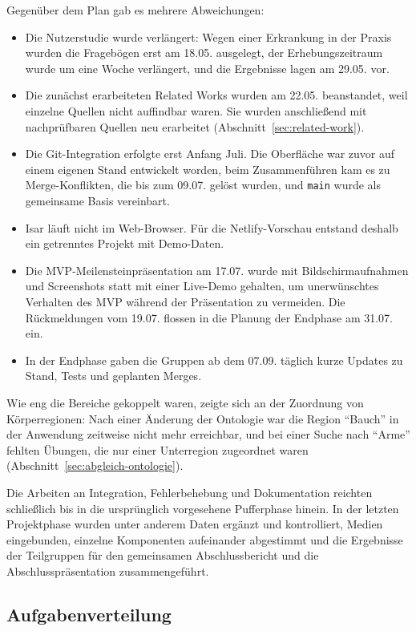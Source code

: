 Gegenüber dem Plan gab es mehrere Abweichungen:
\begin{itemize}
    \item Die Nutzerstudie wurde verlängert: Wegen einer Erkrankung in der Praxis wurden die Fragebögen erst am 18.05. ausgelegt, der Erhebungszeitraum wurde um eine Woche verlängert, und die Ergebnisse lagen am 29.05. vor.
    \item Die zunächst erarbeiteten Related Works wurden am 22.05. beanstandet, weil einzelne Quellen nicht auffindbar waren. Sie wurden anschließend mit nachprüfbaren Quellen neu erarbeitet (Abschnitt~\ref{sec:related-work}).
    \item Die Git-Integration erfolgte erst Anfang Juli. Die Oberfläche war zuvor auf einem eigenen Stand entwickelt worden, beim Zusammenführen kam es zu Merge-Konflikten, die bis zum 09.07. gelöst wurden, und \texttt{main} wurde als gemeinsame Basis vereinbart.
    \item Isar läuft nicht im Web-Browser. Für die Netlify-Vorschau entstand deshalb ein getrenntes Projekt mit Demo-Daten.
    \item Die MVP-Meilensteinpräsentation am 17.07. wurde mit Bildschirmaufnahmen und Screenshots statt mit einer Live-Demo gehalten, um unerwünschtes Verhalten des MVP während der Präsentation zu vermeiden. Die Rückmeldungen vom 19.07. flossen in die Planung der Endphase am 31.07. ein.
    \item In der Endphase gaben die Gruppen ab dem 07.09. täglich kurze Updates zu Stand, Tests und geplanten Merges.
\end{itemize}

Wie eng die Bereiche gekoppelt waren, zeigte sich an der Zuordnung von Körperregionen: Nach einer Änderung der Ontologie war die Region ``Bauch'' in der Anwendung zeitweise nicht mehr erreichbar, und bei einer Suche nach ``Arme'' fehlten Übungen, die nur einer Unterregion zugeordnet waren (Abschnitt~\ref{sec:abgleich-ontologie}).

Die Arbeiten an Integration, Fehlerbehebung und Dokumentation reichten schließlich bis in die ursprünglich vorgesehene Pufferphase hinein. In der letzten Projektphase wurden unter anderem Daten ergänzt und kontrolliert, Medien eingebunden, einzelne Komponenten aufeinander abgestimmt und die Ergebnisse der Teilgruppen für den gemeinsamen Abschlussbericht und die Abschlusspräsentation zusammengeführt.

\subsection{Aufgabenverteilung}

